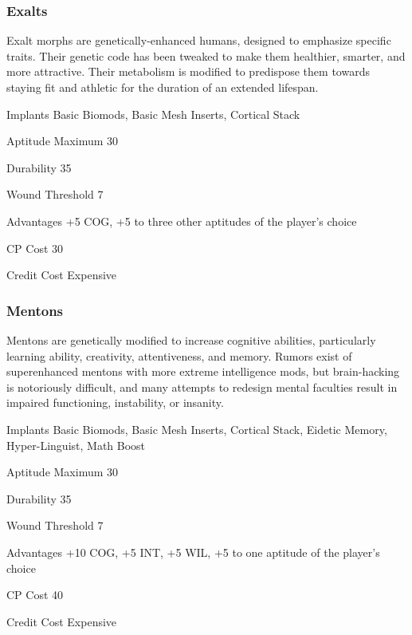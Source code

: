 \subsubsection{Exalts}
\label{sec:starting-exalts}

Exalt morphs are genetically-enhanced humans, designed to emphasize specific traits. Their genetic code has been tweaked to make them healthier, smarter, and more attractive. Their metabolism is modified to predispose them towards staying fit and athletic for the duration of an extended lifespan.

\begin{description*}
\item[Implants] Basic Biomods, Basic Mesh Inserts, Cortical Stack
\item[Aptitude Maximum] 30 
\item[Durability] 35 
\item[Wound Threshold] 7 
\item[Advantages] +5 COG, +5 to three other aptitudes of the player’s choice 
\item[CP Cost] 30 
\item[Credit Cost] Expensive
\end{description*}

\subsubsection{Mentons}
\label{sec:starting-mentons}

Mentons are genetically modified to increase cognitive abilities, particularly learning ability, creativity, attentiveness, and memory. Rumors exist of superenhanced mentons with more extreme intelligence mods, but brain-hacking is notoriously difficult, and many attempts to redesign mental faculties result in impaired functioning, instability, or insanity.

\begin{description*}
\item[Implants] Basic Biomods, Basic Mesh Inserts, Cortical Stack, Eidetic Memory, Hyper-Linguist, Math Boost
\item[Aptitude Maximum] 30 
\item[Durability] 35 
\item[Wound Threshold] 7 
\item[Advantages] +10 COG, +5 INT, +5 WIL, +5 to one aptitude of the player’s choice
\item[CP Cost] 40 
\item[Credit Cost] Expensive
\end{description*}

